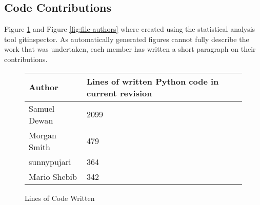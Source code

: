 
\subsection{Code Contributions}

Figure \ref{fig:lines-of-code} and Figure \ref{fig:file-authors} where created
using the statistical analysis tool gitinspector. As automatically generated
figures cannot fully describe the work that was undertaken, each member has
written a short paragraph on their contributions.

\begin{figure}[!htb]
\centering
\begin{tabular}{ll}
Author & Lines of written Python code in current revision\\
\hline
Samuel Dewan &  2099\\
Morgan Smith &   479\\
sunnypujari  &   364\\
Mario Shebib &   342\\
\end{tabular}
\caption{Lines of Code Written}
\label{fig:lines-of-code}
\end{figure}

